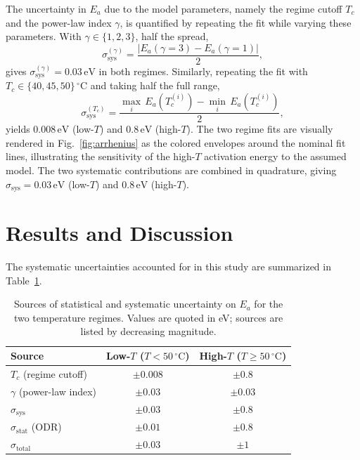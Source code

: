 \documentclass[aps,twocolumn,secnumarabic,balancelastpage,amsmath,amssymb,nofootinbib,floatfix]{revtex4-1}
\begin{document}
The uncertainty in $E_a$ due to the model parameters, namely the regime cutoff $T_c$ and the power-law index $\gamma$, is quantified by repeating the fit while varying these parameters. With $\gamma \in \{1, 2, 3\}$, half the spread,
\begin{equation}
    \sigma_{\mathrm{sys}}^{(\gamma)} = \frac{|E_a(\gamma=3) - E_a(\gamma=1)|}{2},
    \label{eq:sys_gamma}
\end{equation}
gives $\sigma_{\mathrm{sys}}^{(\gamma)} = 0.03\,\text{eV}$ in both regimes. Similarly, repeating the fit with $T_c \in \{40, 45, 50\}\,^{\circ}\text{C}$ and taking half the full range,
\begin{equation}
    \sigma_{\mathrm{sys}}^{(T_c)} = \frac{\displaystyle\max_{i}\,E_a(T_c^{(i)}) - \min_{i}\,E_a(T_c^{(i)})}{2},
    \label{eq:sys_cutoff}
\end{equation}
yields $0.008\,\text{eV}$ (low-$T$) and $0.8\,\text{eV}$ (high-$T$). The two regime fits are visually rendered in Fig.~\ref{fig:arrhenius} as the colored envelopes around the nominal fit lines, illustrating the sensitivity of the high-$T$ activation energy to the assumed model. The two systematic contributions are combined in quadrature, giving $\sigma_{\mathrm{sys}} = 0.03\,\text{eV}$ (low-$T$) and $0.8\,\text{eV}$ (high-$T$).


\section{Results and Discussion}
The systematic uncertainties accounted for in this study are summarized in Table~\ref{tab:systematics}.

\begin{table}[h]
\centering
\caption{Sources of statistical and systematic uncertainty on $E_a$ for the two temperature regimes. Values are quoted in eV; sources are listed by decreasing magnitude.}
\label{tab:systematics}
\begin{tabular}{lcc}
\hline\hline
Source
  & Low-$T$ ($T < 50\,^{\circ}\text{C}$)
  & High-$T$ ($T \geq 50\,^{\circ}\text{C}$) \\
\hline
$T_c$ (regime cutoff)
  & $\pm 0.008$
  & $\pm 0.8$ \\
$\gamma$ (power-law index)
  & $\pm 0.03$
  & $\pm 0.03$ \\
\hline
$\sigma_{\mathrm{sys}}$ 
  & $\pm 0.03$
  & $\pm 0.8$ \\
$\sigma_{\mathrm{stat}}$ (ODR)
  & $\pm 0.01$
  & $\pm 0.8$ \\
\hline
$\sigma_{\mathrm{total}}$ 
  & $\pm 0.03$
  & $\pm 1$ \\
\hline\hline
\end{tabular}
\end{table}
\end{document}
